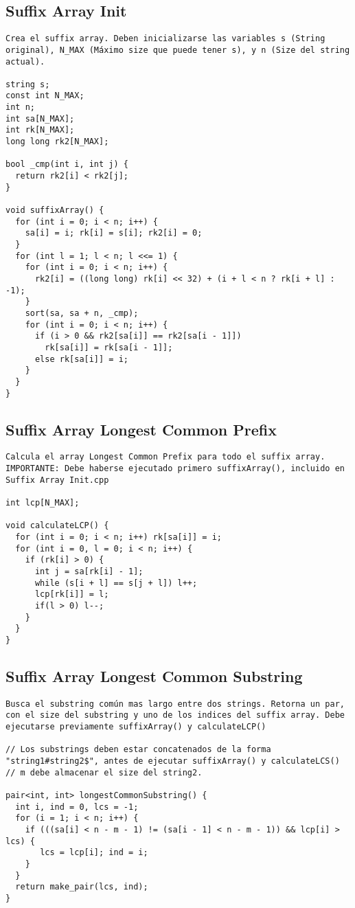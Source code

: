 \documentclass[10pt,letterpaper,twocolumn,twosided]{article}
\begin{document}
\subsection{Suffix Array Init}
\begin{lstlisting}
Crea el suffix array. Deben inicializarse las variables s (String original), N_MAX (Máximo size que puede tener s), y n (Size del string actual).

string s;
const int N_MAX;
int n; 
int sa[N_MAX];
int rk[N_MAX];
long long rk2[N_MAX];

bool _cmp(int i, int j) { 
  return rk2[i] < rk2[j];
}

void suffixArray() {
  for (int i = 0; i < n; i++) {
    sa[i] = i; rk[i] = s[i]; rk2[i] = 0;
  }
  for (int l = 1; l < n; l <<= 1) {
    for (int i = 0; i < n; i++) {
      rk2[i] = ((long long) rk[i] << 32) + (i + l < n ? rk[i + l] : -1);
    }
    sort(sa, sa + n, _cmp);
    for (int i = 0; i < n; i++) {
      if (i > 0 && rk2[sa[i]] == rk2[sa[i - 1]]) 
        rk[sa[i]] = rk[sa[i - 1]]; 
      else rk[sa[i]] = i;
    }
  }
}\end{lstlisting}

\subsection{Suffix Array Longest Common Prefix}
\begin{lstlisting}
Calcula el array Longest Common Prefix para todo el suffix array. IMPORTANTE: Debe haberse ejecutado primero suffixArray(), incluido en Suffix Array Init.cpp

int lcp[N_MAX];

void calculateLCP() {
  for (int i = 0; i < n; i++) rk[sa[i]] = i;
  for (int i = 0, l = 0; i < n; i++) {
    if (rk[i] > 0) {
      int j = sa[rk[i] - 1];
      while (s[i + l] == s[j + l]) l++;
      lcp[rk[i]] = l;
      if(l > 0) l--;
    }
  }
}\end{lstlisting}

\subsection{Suffix Array Longest Common Substring}
\begin{lstlisting}
Busca el substring común mas largo entre dos strings. Retorna un par, con el size del substring y uno de los indices del suffix array. Debe ejecutarse previamente suffixArray() y calculateLCP()

// Los substrings deben estar concatenados de la forma "string1#string2$", antes de ejecutar suffixArray() y calculateLCS()
// m debe almacenar el size del string2.

pair<int, int> longestCommonSubstring() {
  int i, ind = 0, lcs = -1;
  for (i = 1; i < n; i++) {
  	if (((sa[i] < n - m - 1) != (sa[i - 1] < n - m - 1)) && lcp[i] > lcs) { 
       lcs = lcp[i]; ind = i;
    }
  }
  return make_pair(lcs, ind);
}\end{lstlisting}
\end{document}
